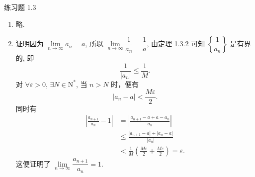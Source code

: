 


% 

\begin{center}
    {\heiti 练习题 1.3}
\end{center}

\begin{enumerate}
    \item 略.
    \item
        {\heiti 证明}\quad 因为 $\lim\limits_{n\to\infty}a_n = a$, 所以 $\lim\limits_{n\to\infty}\dfrac{1}{a_n} = \dfrac1a$,
        由定理 1.3.2 可知 $\left\{\dfrac{1}{a_n}\right\}$ 是有界的, 即
        \[
            \frac{1}{|a_n|}\leqslant\frac1M.
        \]
        对 $\forall \varepsilon > 0$, $\exists N \in \mathrm{N}^*$, 当 $n > N$ 时，便有
        \begin{equation*}
            |a_n - a| < \frac{M\varepsilon}{2}.
        \end{equation*}
        同时有
        \begin{align*}
            \left| \frac{a_{n+1}}{a_n} - 1 \right| &= \left| \frac{a_{n+1} - a + a - a_n}{a_n} \right| \\
                                                   &\leqslant \frac{|a_{n+1} - a| + |a_n - a|}{|a_n|} \\
                                                   &< \frac1M\left( \frac{M\varepsilon}{2} + \frac{M\varepsilon}{2} \right) = \varepsilon.
        \end{align*}
        这便证明了 $\lim\limits_{n\to\infty}\dfrac{a_{n+1}}{a_n} = 1$.
    

\end{enumerate}
